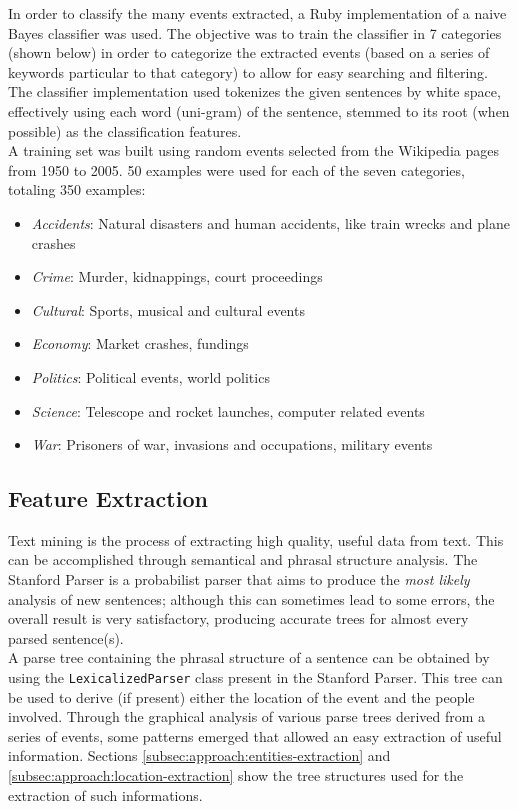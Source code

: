 \documentclass{llncs}
\begin{document}
In order to classify the many events extracted, a Ruby implementation of a naive Bayes classifier\cite{classifier} was used. The objective was to train the classifier in 7 categories (shown below) in order to categorize the extracted events (based on a series of keywords particular to that category) to allow for easy searching and filtering. The classifier implementation used tokenizes the given sentences by white space, effectively using each word (uni-gram) of the sentence, stemmed to its root (when possible) as the classification features.\\

A training set was built using random events selected from the Wikipedia pages from 1950 to 2005. 50 examples were used for each of the seven categories, totaling 350 examples:

\begin{itemize}
	\item \textit{Accidents}: Natural disasters and human accidents, like train wrecks and plane crashes
	\item \textit{Crime}: Murder, kidnappings, court proceedings
	\item \textit{Cultural}: Sports, musical and cultural events
	\item \textit{Economy}: Market crashes, fundings
	\item \textit{Politics}: Political events, world politics
	\item \textit{Science}: Telescope and rocket launches, computer related events
	\item \textit{War}: Prisoners of war, invasions and occupations, military events
\end{itemize}

\subsection{Feature Extraction}
\label{subsec:approach:nlp}

Text mining is the process of extracting high quality, useful data from text. This can be accomplished through semantical and phrasal structure analysis. The Stanford Parser is a probabilist parser that aims to produce the \textit{most likely} analysis of new sentences; although this can sometimes lead to some errors, the overall result is very satisfactory, producing accurate trees for almost every parsed sentence(s).\\

A parse tree containing the phrasal structure of a sentence can be obtained by using the \verb!LexicalizedParser! class present in the Stanford Parser. This tree can be used to derive (if present) either the location of the event and the people involved. Through the graphical analysis of various parse trees derived from a series of events, some patterns emerged that allowed an easy extraction of useful information. Sections \ref{subsec:approach:entities-extraction} and \ref{subsec:approach:location-extraction} show the tree structures used for the extraction of such informations.\cite{santorini}\cite{bies}\\
\end{document}
